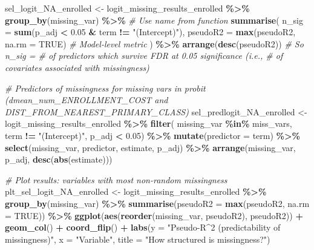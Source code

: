\documentclass[
]{article}
\newenvironment{Shaded}{\begin{snugshade}}{\end{snugshade}}
\newcommand{\AttributeTok}[1]{\textcolor[rgb]{0.13,0.29,0.53}{#1}}
\newcommand{\CommentTok}[1]{\textcolor[rgb]{0.56,0.35,0.01}{\textit{#1}}}
\newcommand{\ConstantTok}[1]{\textcolor[rgb]{0.56,0.35,0.01}{#1}}
\newcommand{\FloatTok}[1]{\textcolor[rgb]{0.00,0.00,0.81}{#1}}
\newcommand{\FunctionTok}[1]{\textcolor[rgb]{0.13,0.29,0.53}{\textbf{#1}}}
\newcommand{\NormalTok}[1]{#1}
\newcommand{\OtherTok}[1]{\textcolor[rgb]{0.56,0.35,0.01}{#1}}
\newcommand{\SpecialCharTok}[1]{\textcolor[rgb]{0.81,0.36,0.00}{\textbf{#1}}}
\newcommand{\StringTok}[1]{\textcolor[rgb]{0.31,0.60,0.02}{#1}}
\begin{document}
\begin{Shaded}
\begin{Highlighting}[]
\NormalTok{sel\_logit\_NA\_enrolled }\OtherTok{\textless{}{-}}\NormalTok{ logit\_missing\_results\_enrolled }\SpecialCharTok{\%\textgreater{}\%}
  \FunctionTok{group\_by}\NormalTok{(missing\_var) }\SpecialCharTok{\%\textgreater{}\%} \CommentTok{\# Use name from function}
  \FunctionTok{summarise}\NormalTok{(}
    \AttributeTok{n\_sig =} \FunctionTok{sum}\NormalTok{(p\_adj }\SpecialCharTok{\textless{}} \FloatTok{0.05} \SpecialCharTok{\&}\NormalTok{ term }\SpecialCharTok{!=} \StringTok{"(Intercept)"}\NormalTok{),}
    \AttributeTok{pseudoR2 =} \FunctionTok{max}\NormalTok{(pseudoR2, }\AttributeTok{na.rm =} \ConstantTok{TRUE}\NormalTok{) }\CommentTok{\# Model{-}level metric}
\NormalTok{  ) }\SpecialCharTok{\%\textgreater{}\%}
  \FunctionTok{arrange}\NormalTok{(}\FunctionTok{desc}\NormalTok{(pseudoR2))}
\CommentTok{\# So n\_sig = \# of predictors which survive FDR at 0.05 significance (i.e., \# of covariates associated with missingness)}

\CommentTok{\# Predictors of missingness for missing vars in probit (dmean\_num\_ENROLLMENT\_COST and DIST\_FROM\_NEAREST\_PRIMARY\_CLASS)}
\NormalTok{sel\_predlogit\_NA\_enrolled }\OtherTok{\textless{}{-}}\NormalTok{ logit\_missing\_results\_enrolled }\SpecialCharTok{\%\textgreater{}\%} 
  \FunctionTok{filter}\NormalTok{(}
\NormalTok{    missing\_var }\SpecialCharTok{\%in\%}\NormalTok{ miss\_vars,}
\NormalTok{    term }\SpecialCharTok{!=} \StringTok{"(Intercept)"}\NormalTok{,}
\NormalTok{    p\_adj }\SpecialCharTok{\textless{}} \FloatTok{0.05}\NormalTok{) }\SpecialCharTok{\%\textgreater{}\%} 
  \FunctionTok{mutate}\NormalTok{(}\AttributeTok{predictor =}\NormalTok{ term) }\SpecialCharTok{\%\textgreater{}\%}
  \FunctionTok{select}\NormalTok{(missing\_var, predictor, estimate, p\_adj) }\SpecialCharTok{\%\textgreater{}\%} 
  \FunctionTok{arrange}\NormalTok{(missing\_var, p\_adj, }\FunctionTok{desc}\NormalTok{(}\FunctionTok{abs}\NormalTok{(estimate)))}

\CommentTok{\# Plot results: variables with most non{-}random missingness}
\NormalTok{plt\_sel\_logit\_NA\_enrolled }\OtherTok{\textless{}{-}}\NormalTok{ logit\_missing\_results\_enrolled }\SpecialCharTok{\%\textgreater{}\%}
  \FunctionTok{group\_by}\NormalTok{(missing\_var) }\SpecialCharTok{\%\textgreater{}\%}
  \FunctionTok{summarise}\NormalTok{(}\AttributeTok{pseudoR2 =} \FunctionTok{max}\NormalTok{(pseudoR2, }\AttributeTok{na.rm =} \ConstantTok{TRUE}\NormalTok{)) }\SpecialCharTok{\%\textgreater{}\%}
  \FunctionTok{ggplot}\NormalTok{(}\FunctionTok{aes}\NormalTok{(}\FunctionTok{reorder}\NormalTok{(missing\_var, pseudoR2), pseudoR2)) }\SpecialCharTok{+}
  \FunctionTok{geom\_col}\NormalTok{() }\SpecialCharTok{+}
  \FunctionTok{coord\_flip}\NormalTok{() }\SpecialCharTok{+}
  \FunctionTok{labs}\NormalTok{(}\AttributeTok{y =} \StringTok{"Pseudo{-}R\^{}2 (predictability of missingness)"}\NormalTok{,}
       \AttributeTok{x =} \StringTok{"Variable"}\NormalTok{,}
       \AttributeTok{title =} \StringTok{"How structured is missingness?"}\NormalTok{)}



\end{Highlighting}
\end{Shaded}
\end{document}
